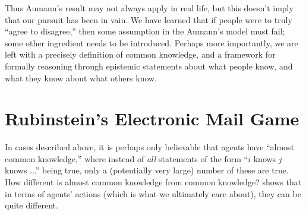 




Thus Aumann's result may not always apply in real life, but this doesn't imply that our pursuit has been in vain.
We have learned that if people were to truly ``agree to disagree,'' then some assumption in the Aumann's model must fail; some other ingredient needs to be introduced.
Perhaps more importantly, we are left with a precisely definition of common knowledge, and a framework for formally reasoning through epistemic statements about what people know, and what they know about what others know.



\section{Rubinstein's Electronic Mail Game}
In cases described above, it is perhaps only believable that agents have ``almost common knowledge,'' where instead of \emph{all} statements of the form ``\(i\) knows \(j\) knows ...'' being true, only a (potentially very large) number of these are true.
How different is almost common knowledge from common knowledge?
\Textcite{rubinstein1989ElectronicMail} shows that in terms of agents' actions (which is what we ultimately care about), they can be quite different.


